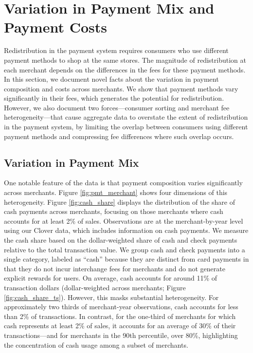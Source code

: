 \documentclass[main.tex]{subfiles}
\begin{document}
\section{Variation in Payment Mix and Payment Costs\label{sec:costs}}

Redistribution in the payment system requires consumers who use different payment methods to shop at the same stores.
The magnitude of redistribution at each merchant depends on the differences in the fees for these payment methods.
In this section, we document novel facts about the variation in payment composition and costs across merchants.
We show that payment methods vary significantly in their fees, which generates the potential for redistribution.
However, we also document two forces---consumer sorting and merchant fee heterogeneity---that cause aggregate data to overstate the extent of redistribution in the payment system, by limiting the overlap between consumers using different payment methods and compressing fee differences where such overlap occurs.

\subsection{Variation in Payment Mix\label{subsec:payment-mix}}

One notable feature of the data is that payment composition varies significantly across merchants. Figure \ref{fig:pmt_merchant} shows four dimensions of this heterogeneity.
Figure \ref{fig:cash_share} displays the distribution of the share of cash payments across merchants, focusing on those merchants where cash accounts for at least 2\% of sales.
Observations are at the merchant-by-year level using our Clover data, which includes information on cash payments.
We measure the cash share based on the dollar-weighted share of cash and check payments relative to the total transaction value.
We group cash and check payments into a single category, labeled as ``cash'' because they are distinct from card payments in that they do not incur interchange fees for merchants and do not generate explicit rewards for users.
On average, cash accounts for around 11\% of transaction dollars (dollar-weighted across merchants; Figure \ref{fig:cash_share_ts}).
However, this masks substantial heterogeneity.
For approximately two thirds of merchant-year observations, cash accounts for less than 2\% of transactions.
In contrast, for the one-third of merchants for which cash represents at least 2\% of sales, it accounts for an average of 30\% of their transactions---and for merchants in the 90th percentile, over 80\%, highlighting the concentration of cash usage among a subset of merchants.
\end{document}
